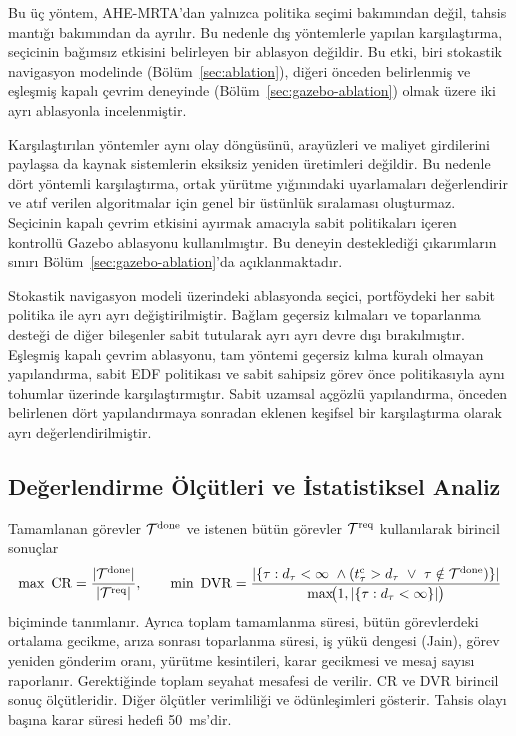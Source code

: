\documentclass[10pt,letterpaper,onecolumn]{IEEEtran}
\begin{document}
Bu üç yöntem, AHE-MRTA'dan yalnızca politika seçimi bakımından değil, tahsis
mantığı bakımından da ayrılır. Bu nedenle dış yöntemlerle yapılan karşılaştırma,
seçicinin bağımsız etkisini belirleyen bir ablasyon değildir. Bu etki, biri
stokastik navigasyon modelinde (Bölüm~\ref{sec:ablation}), diğeri önceden
belirlenmiş ve eşleşmiş kapalı çevrim deneyinde
(Bölüm~\ref{sec:gazebo-ablation}) olmak üzere iki ayrı ablasyonla incelenmiştir.

Karşılaştırılan yöntemler aynı olay döngüsünü, arayüzleri ve maliyet girdilerini
paylaşsa da kaynak sistemlerin eksiksiz yeniden üretimleri değildir. Bu nedenle
dört yöntemli karşılaştırma, ortak yürütme yığınındaki uyarlamaları değerlendirir
ve atıf verilen algoritmalar için genel bir üstünlük sıralaması oluşturmaz.
Seçicinin kapalı çevrim etkisini ayırmak amacıyla sabit politikaları içeren
kontrollü Gazebo ablasyonu kullanılmıştır. Bu deneyin desteklediği çıkarımların
sınırı Bölüm~\ref{sec:gazebo-ablation}'da açıklanmaktadır.

Stokastik navigasyon modeli üzerindeki ablasyonda seçici, portföydeki her sabit
politika ile ayrı ayrı değiştirilmiştir. Bağlam geçersiz kılmaları ve
toparlanma desteği de diğer bileşenler sabit tutularak ayrı ayrı devre dışı
bırakılmıştır. Eşleşmiş kapalı çevrim ablasyonu, tam yöntemi geçersiz kılma
kuralı olmayan yapılandırma, sabit EDF politikası ve sabit sahipsiz görev önce
politikasıyla aynı tohumlar üzerinde karşılaştırmıştır. Sabit uzamsal açgözlü
yapılandırma, önceden belirlenen dört yapılandırmaya sonradan eklenen keşifsel
bir karşılaştırma olarak ayrı değerlendirilmiştir.

\subsection{Değerlendirme Ölçütleri ve İstatistiksel Analiz}
\label{sec:metrics}

Tamamlanan görevler $\mathcal T^{\rm done}$ ve istenen bütün görevler
$\mathcal T^{\rm req}$ kullanılarak birincil sonuçlar
\begin{equation}
  \max\ \mathrm{CR}=
  \frac{|\mathcal{T}^{\rm done}|}{|\mathcal{T}^{\rm req}|},
  \qquad
  \min\ \mathrm{DVR}=
  \frac{|\{\tau:d_\tau<\infty\ \wedge
  (t_\tau^{\rm c}>d_\tau\ \vee\ \tau\notin\mathcal{T}^{\rm done})\}|}
  {\max\!\bigl(1,|\{\tau:d_\tau<\infty\}|\bigr)}
  \label{eq:primary-outcomes}
\end{equation}
biçiminde tanımlanır. Ayrıca toplam tamamlanma süresi, bütün görevlerdeki
ortalama gecikme, arıza sonrası toparlanma süresi, iş yükü dengesi (Jain), görev
yeniden gönderim oranı, yürütme kesintileri, karar gecikmesi ve mesaj sayısı
raporlanır. Gerektiğinde toplam seyahat mesafesi de verilir. CR ve DVR
birincil sonuç ölçütleridir. Diğer ölçütler verimliliği ve ödünleşimleri
gösterir. Tahsis olayı başına karar süresi hedefi 50~ms'dir.
\end{document}
